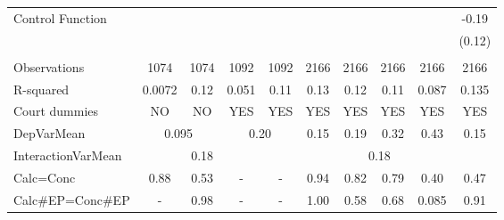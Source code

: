 \begin{tabular}{lccccccccc}
Control Function &       &       &       &       &       &       &       &       & -0.19 \\
      &       &       &       &       &       &       &       &       & (0.12) \\
      &       &       &       &       &       &       &       &       &  \\
\midrule
Observations & 1074  & 1074  & 1092  & 1092  & 2166  & 2166  & 2166  & 2166  & 2166 \\
R-squared & 0.0072 & 0.12  & 0.051 & 0.11  & 0.13  & 0.12  & 0.11  & 0.087 & 0.135 \\
Court dummies  & NO    & NO    & YES   & YES   & YES   & YES   & YES   & YES   & YES \\
DepVarMean & \multicolumn{2}{c}{0.095} & \multicolumn{2}{c}{0.20} & 0.15  & 0.19  & 0.32  & 0.43  & 0.15 \\
InteractionVarMean &       & 0.18  &       & \multicolumn{6}{c}{0.18} \\
Calc=Conc & 0.88  & 0.53  & -     & -     & 0.94  & 0.82  & 0.79  & 0.40  & 0.47 \\
Calc\#EP=Conc\#EP & -     & 0.98  & -     & -     & 1.00  & 0.58  & 0.68  & 0.085 & 0.91 \\
\bottomrule
\bottomrule
\end{tabular}%
